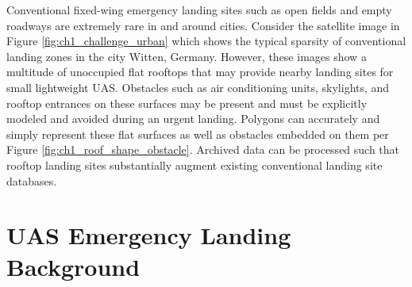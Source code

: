 Conventional fixed-wing emergency landing sites such as open fields and empty roadways are extremely rare in and around cities. Consider the satellite image in Figure \ref{fig:ch1_challenge_urban} which shows the typical sparsity of conventional landing zones in the city Witten, Germany. However, these images show a multitude of unoccupied flat rooftops that may provide nearby landing sites for small lightweight UAS. Obstacles such as air conditioning units, skylights, and rooftop entrances on these surfaces may be present and must be explicitly modeled and avoided during an urgent landing. Polygons can accurately and simply represent these flat surfaces as well as obstacles embedded on them per Figure \ref{fig:ch1_roof_shape_obstacle}. Archived data can be processed such that rooftop landing sites substantially augment existing conventional landing site databases.




\section{UAS Emergency Landing Background}





